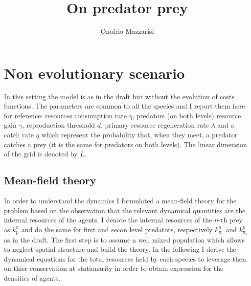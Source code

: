 \documentclass[10pt]{article}
\title{On predator prey}
\author{Onofrio Mazzarisi}
\begin{document}

\maketitle

\section{Non evolutionary scenario}
In this setting the model is as in the draft but without the evolution of costs functions.
The parameters are common to all the species and I report them here for reference:
resources consumption rate $\eta$, predators (on both levels) resource gain $\gamma$, reproduction threshold $d$,
primary resource regeneration rate $\lambda$ and a catch rate $q$ which represent the
probability that, when they meet, a predator catches a prey (it is the same for predators on both levels).
The linear dimension of the grid is denoted by $L$.

\subsection{Mean-field theory}
In order to understand the dynamics I formulated a mean-field theory for the problem
based on the observation that the relevant dynamical quantities are the internal resources of the agents.
I denote the internal resources of the $n$-th prey as $k^n_p$ and do the same
for first and secon level predators, respectively  $k^n_{\pi_1}$ and $k^n_{\pi_2}$ as in the draft.
The first step is to assume a well mixed population which allows to neglect spatial
structure and build the theory. In the following I derive the dynamical equations
for the total resources held by each species to leverage then on thier conservation at
stationarity in order to obtain expression for the densities of agents.
\end{document}
